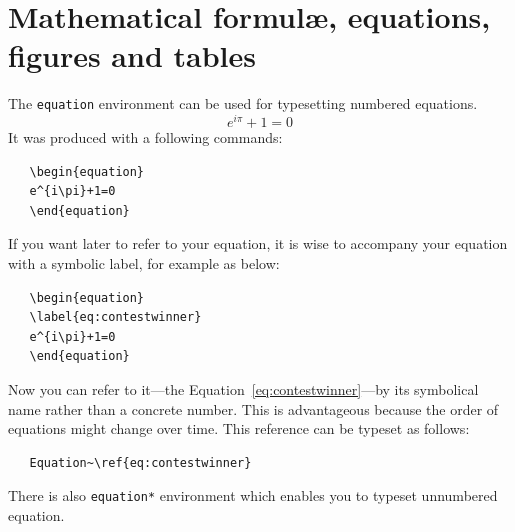 \documentclass{iitsrc}
\begin{document}
\section{Mathematical formul\ae, equations, figures and tables}
%
The \verb|equation| environment can be used for typesetting numbered
equations.
\begin{equation}
\label{eq:contestwinner}
e^{i\pi}+1=0
\end{equation}
It was produced with a following commands:
\begin{verbatim}
   \begin{equation}
   e^{i\pi}+1=0
   \end{equation}
\end{verbatim}
If you want later to refer to your equation, it is wise to accompany
your equation with a symbolic label, for example as below:
\begin{verbatim}
   \begin{equation}
   \label{eq:contestwinner}
   e^{i\pi}+1=0
   \end{equation}
\end{verbatim}
Now you can refer to it---the
Equation~\ref{eq:contestwinner}---by its
symbolical name rather than a concrete number. This is advantageous
because the order of equations might change over time. This reference
can be typeset as follows:
\begin{verbatim}
   Equation~\ref{eq:contestwinner}
\end{verbatim}
There is also \verb|equation*| environment which enables you to
typeset unnumbered equation.
\end{document}
